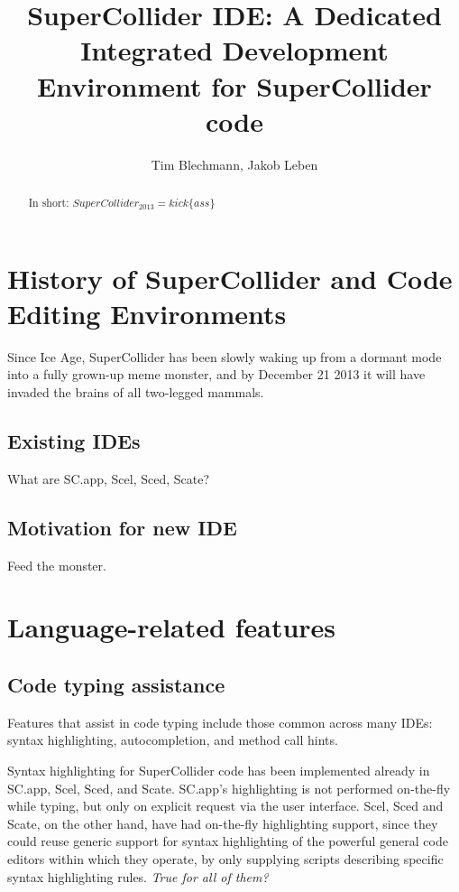 \documentclass[a4paper,10pt]{article}
\title{SuperCollider IDE: A Dedicated Integrated Development Environment for SuperCollider code}
\author{Tim Blechmann, Jakob Leben}
\begin{document}
\maketitle

\begin{abstract}
In short: $SuperCollider_{2013} = kick\{ass\}$
\end{abstract}

\section{History of SuperCollider and Code Editing Environments}

Since Ice Age, SuperCollider has been slowly waking up from a dormant mode into a fully grown-up
meme monster, and by December 21 2013 it will have invaded the brains of all two-legged mammals.

\subsection{Existing IDEs}

What are SC.app, Scel, Sced, Scate?

\subsection{Motivation for new IDE}

Feed the monster.

\section{Language-related features}

\subsection{Code typing assistance}

Features that assist in code typing include those common across many IDEs: syntax highlighting,
autocompletion, and method call hints.

Syntax highlighting for SuperCollider code has been implemented already in SC.app, Scel, Sced, and
Scate. SC.app's highlighting is not performed on-the-fly while typing, but only on explicit request
via the user interface. Scel, Sced and Scate, on the other hand, have had on-the-fly highlighting
support, since they could reuse generic support for syntax highlighting of the powerful general code
editors within which they operate, by only supplying scripts describing specific syntax highlighting
rules. \emph{True for all of them?}
\end{document}
